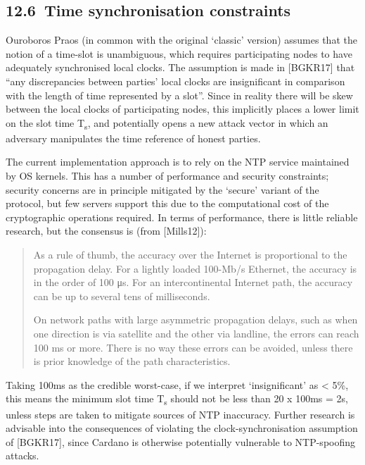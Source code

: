 \documentclass[]{article}
\begin{document}
\hypertarget{time-synchronisation-constraints}{%
\subsection{​12.6​~Time synchronisation
constraints}\label{time-synchronisation-constraints}}

Ouroboros Praos (in common with the original `classic' version) assumes
that the notion of a time-slot is unambiguous, which requires
participating nodes to have adequately synchronised local clocks. The
assumption is made in {[}BGKR17{]} that ``any discrepancies between
parties' local clocks are insignificant in comparison with the length of
time represented by a slot''. Since in reality there will be skew
between the local clocks of participating nodes, this implicitly places
a lower limit on the slot time T\textsubscript{s}, and potentially opens
a new attack vector in which an adversary manipulates the time reference
of honest parties.

The current implementation approach is to rely on the NTP service
maintained by OS kernels. This has a number of performance and security
constraints; security concerns are in principle mitigated by the
`secure' variant of the protocol, but few servers support this due to
the computational cost of the cryptographic operations required. In
terms of performance, there is little reliable research, but the
consensus is (from {[}Mills12{]}):

\begin{quote}
As a rule of thumb, the accuracy over the Internet is proportional to
the propagation delay. For a lightly loaded 100-Mb/s Ethernet, the
accuracy is in the order of 100 μs. For an intercontinental Internet
path, the accuracy can be up to several tens of milliseconds.

On network paths with large asymmetric propagation delays, such as when
one direction is via satellite and the other via landline, the errors
can reach 100 ms or more. There is no way these errors can be avoided,
unless there is prior knowledge of the path characteristics.
\end{quote}

Taking 100ms as the credible worst-case, if we interpret `insignificant'
as \textless{} 5\%, this means the minimum slot time T\textsubscript{s}
should not be less than 20 x 100ms = 2s, unless steps are taken to
mitigate sources of NTP inaccuracy. Further research is advisable into
the consequences of violating the clock-synchronisation assumption of
{[}BGKR17{]}, since Cardano is otherwise potentially vulnerable to
NTP-spoofing attacks.
\end{document}
